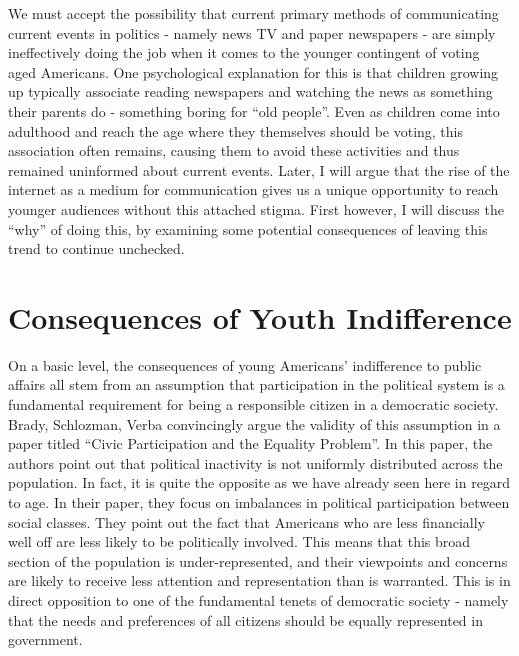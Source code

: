 \documentclass[12pt,letterpaper]{article}
\begin{document}
We must accept the possibility that current primary methods of
communicating current events in politics - namely news TV and paper
newspapers - are simply ineffectively doing the job when it comes to
the younger contingent of voting aged Americans.  One psychological
explanation for this is that children growing up typically associate
reading newspapers and watching the news as something their parents do
- something boring for ``old people''.  Even as children come into
adulthood and reach the age where they themselves should be voting,
this association often remains, causing them to avoid these activities
and thus remained uninformed about current events. Later, I will argue
that the rise of the internet as a medium for communication gives us a
unique opportunity to reach younger audiences without this attached
stigma.  First however, I will discuss the ``why'' of doing this, by
examining some potential consequences of leaving this trend to
continue unchecked.

\section{Consequences of Youth Indifference} %
\label{sec:Consequences of Youth Indifference}
On a basic level, the consequences of young Americans' indifference to
public affairs all stem from an assumption that participation in the
political system is a fundamental requirement for being a responsible
citizen in a democratic society.  Brady, Schlozman, Verba convincingly
argue the validity of this assumption in a paper titled ``Civic
Participation and the Equality Problem''.  In this paper, the authors
point out that political inactivity is not uniformly distributed
across the population.  In fact, it is quite the opposite as we have
already seen here in regard to age.  In their paper, they focus on
imbalances in political participation between social classes. They
point out the fact that Americans who are less financially well off
are less likely to be politically involved.  This means that this
broad section of the population is under-represented, and their
viewpoints and concerns are likely to receive less attention and
representation than is warranted.  This is in direct opposition to one
of the fundamental tenets of democratic society - namely that the
needs and preferences of all citizens should be equally represented in
government.
\end{document}
